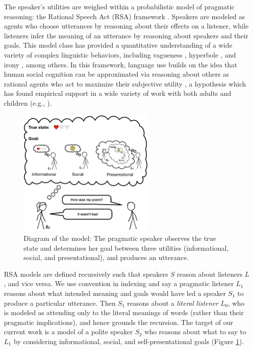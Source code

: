\documentclass[9pt,twocolumn,twoside,lineno]{main_class_file}
\begin{document}
The speaker's utilities are weighed within a probabilistic model of pragmatic reasoning: the Rational Speech Act (RSA) framework \cite{frank2012, goodman2016}. Speakers are modeled as
agents who choose utterances by reasoning about their effects on a
listener, while listeners infer the meaning of an utterance by reasoning about speakers and their goals.
This model class has provided a quantitative understanding of a wide variety of complex linguistic behaviors, including vagueness \cite{lassiter2017adjectival}, hyperbole \cite{kao2014}, and irony
\cite{kao2015}, among others.
In this framework, language use builds on the idea that human social cognition can
be approximated via reasoning about others as rational agents who act to
maximize their subjective utility \cite{baker2009action}, a
hypothesis which has found empirical support in a wide variety of work with both
adults and children (e.g., \cite{jara2016naive, liu2017ten}).

\begin{figure}[!h]
\includegraphics[width=0.6\textwidth]{fig/model} \centering \caption{Diagram of the model: The pragmatic speaker observes the true state and determines her goal between three utilities (informational, social, and presentational), and produces an utterance.}\label{fig:model}
\end{figure}

RSA models are defined recursively such that speakers \(S\)  reason about
listeners  \(L\), and vice versa. We use convention in indexing and say a pragmatic listener \(L_1\) reasons about what intended meaning
and goals would have led a speaker \(S_1\) to produce a particular
utterance. Then \(S_1\) reasons about a \emph{literal listener}
\(L_0\), who is modeled as attending only to the literal meanings of words
(rather than their pragmatic implications), and hence grounds the
recursion.
The target of our current work is a model of a polite speaker \(S_2\)
who reasons about what to say to \(L_1\) by
considering informational, social, and self-presentational goals (Figure
\ref{fig:model}).
\end{document}
